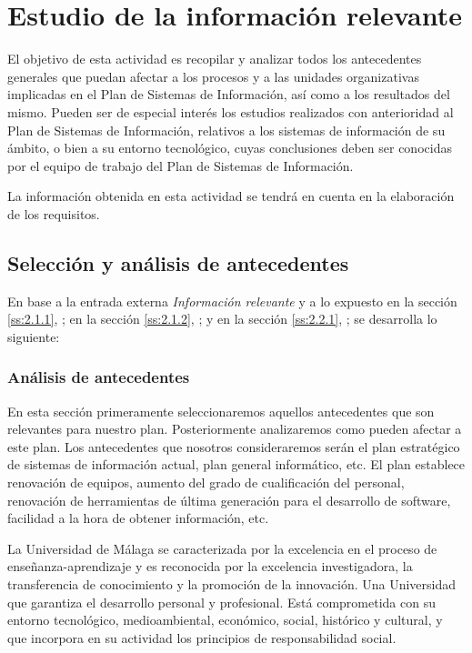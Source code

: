 \documentclass[11pt,a4paper,spanish,twoside]{book}
\begin{document}
\chapter{Estudio de la información relevante}
El objetivo de esta actividad es recopilar y analizar todos los antecedentes
generales que puedan afectar a los procesos y a las unidades organizativas
implicadas en el Plan de Sistemas de Información, así como a los resultados
del mismo. Pueden ser de especial interés los estudios realizados con
anterioridad al Plan de Sistemas de Información, relativos a los sistemas de
información de su ámbito, o bien a su entorno tecnológico, cuyas conclusiones
deben ser conocidas por el equipo de trabajo del Plan de Sistemas de
Información. 

La información obtenida en esta actividad se tendrá en cuenta en
la elaboración de los requisitos.

\section{Selección y análisis de antecedentes}
En base a la entrada externa \emph{Información relevante} y a lo expuesto 
en la sección \vref{ss:2.1.1}, \emph{}; 
en la sección \vref{ss:2.1.2}, \emph{}; y
en la sección \vref{ss:2.2.1}, \emph{}; 
se desarrolla lo siguiente:

\subsection{Análisis de antecedentes} \label{ss:3.1.1}
En esta sección primeramente seleccionaremos aquellos antecedentes que son
relevantes para nuestro plan. Posteriormente analizaremos como pueden
afectar a este plan. Los antecedentes que nosotros consideraremos serán el
plan estratégico de sistemas de información actual, plan general
informático, etc. 
El plan establece renovación de equipos, aumento del grado de cualificación
del personal, renovación de herramientas de última generación para el
desarrollo de software, facilidad a la hora de obtener información, etc. 

La Universidad de Málaga se caracterizada por la excelencia en el proceso de
enseñanza-aprendizaje y es reconocida por la excelencia investigadora, la
transferencia de conocimiento y la promoción de la innovación. Una
Universidad que garantiza el desarrollo personal y profesional. Está
comprometida con su entorno tecnológico, medioambiental, económico, social,
histórico y cultural, y que incorpora en su actividad los principios de
responsabilidad social. 
\end{document}
